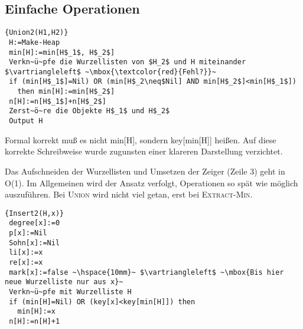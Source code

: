 \subsection{Einfache Operationen}
\begin{Algorithmus}[H]
\begin{lstlisting}[frame=tlrb, mathescape=true, title=\textsc{Union\textnormal{(H$_1$, H$_2$)}},gobble=1]{Union2(H1,H2)}
 H:=Make-Heap
 min[H]:=min[H$_1$, H$_2$]
 Verkn~ü~pfe die Wurzellisten von $H_2$ und H miteinander $\vartriangleleft$ ~\mbox{\textcolor{red}{Fehl?}}~
 if (min[H$_1$]=Nil) OR (min[H$_2\neq$Nil] AND min[H$_2$]<min[H$_1$])
   then min[H]:=min[H$_2$]
 n[H]:=n[H$_1$]+n[H$_2$]
 Zerst~ö~re die Objekte H$_1$ und H$_2$
 Output H     
\end{lstlisting}
Formal korrekt muß es nicht min[H], sondern key[min[H]] heißen. Auf diese korrekte Schreibweise wurde
zugunsten einer klareren Darstellung verzichtet.
\end{Algorithmus}
Das Aufschneiden der Wurzellisten und Umsetzen der Zeiger (Zeile 3) geht in O(1). Im Allgemeinen wird der Ansatz
verfolgt, Operationen so spät wie möglich auszuführen. Bei \textsc{Union} wird nicht viel getan, erst bei
\textsc{Extract-Min}.

\begin{Algorithmus}[H]
\begin{lstlisting}[frame=tlrb, mathescape=true, title=\textsc{Insert\textnormal{(H, x)}}, gobble=1]{Insert2(H,x)}
 degree[x]:=0
 p[x]:=Nil
 Sohn[x]:=Nil
 li[x]:=x
 re[x]:=x
 mark[x]:=false ~\hspace{10mm}~ $\vartriangleleft$ ~\mbox{Bis hier neue Wurzelliste nur aus x}~
 Verkn~ü~pfe mit Wurzelliste H
 if (min[H]=Nil) OR (key[x]<key[min[H]]) then
   min[H]:=x
 n[H]:=n[H]+1   
\end{lstlisting}
\end{Algorithmus}

